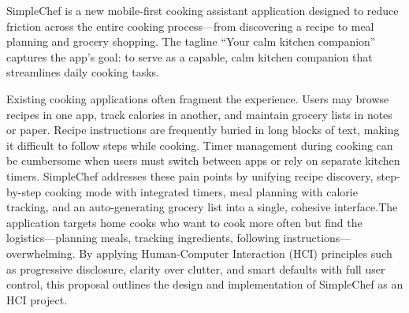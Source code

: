 SimpleChef is a new mobile-first cooking assistant application designed to reduce friction across the entire cooking process---from discovering a recipe to meal planning and grocery shopping. The tagline ``Your calm kitchen companion'' captures the app's goal: to serve as a capable, calm kitchen companion that streamlines daily cooking tasks.

Existing cooking applications often fragment the experience. Users may browse recipes in one app, track calories in another, and maintain grocery lists in notes or paper. Recipe instructions are frequently buried in long blocks of text, making it difficult to follow steps while cooking. Timer management during cooking can be cumbersome when users must switch between apps or rely on separate kitchen timers. SimpleChef addresses these pain points by unifying recipe discovery, step-by-step cooking mode with integrated timers, meal planning with calorie tracking, and an auto-generating grocery list into a single, cohesive interface.The application targets home cooks who want to cook more often but find the logistics---planning meals, tracking ingredients, following instructions---overwhelming. By applying Human-Computer Interaction (HCI) principles such as progressive disclosure, clarity over clutter, and smart defaults with full user control, this proposal outlines the design and implementation of SimpleChef as an HCI project.